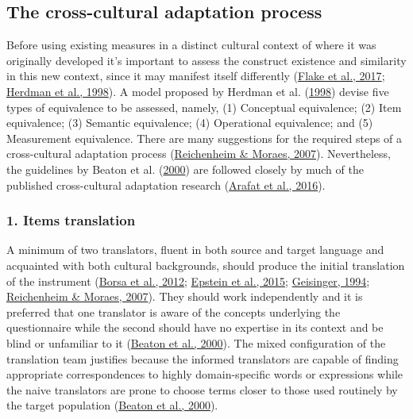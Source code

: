 \documentclass[
  ,doc,11pt, twoside,floatsintext]{apa6}
\begin{document}
\hypertarget{the-cross-cultural-adaptation-process}{%
\subsection{The cross-cultural adaptation process}\label{the-cross-cultural-adaptation-process}}

Before using existing measures in a distinct cultural context of where it was originally developed it's important to assess the construct existence and similarity in this new context, since it may manifest itself differently (\protect\hyperlink{ref-flakeConstructValidationSocial2017}{Flake et al., 2017}; \protect\hyperlink{ref-herdmanModelEquivalenceCultural1998}{Herdman et al., 1998}). A model proposed by Herdman et al. (\protect\hyperlink{ref-herdmanModelEquivalenceCultural1998}{1998}) devise five types of equivalence to be assessed, namely, (1) Conceptual equivalence; (2) Item equivalence; (3) Semantic equivalence; (4) Operational equivalence; and (5) Measurement equivalence. There are many suggestions for the required steps of a cross-cultural adaptation process (\protect\hyperlink{ref-reichenheim2007}{Reichenheim \& Moraes, 2007}). Nevertheless, the guidelines by Beaton et al. (\protect\hyperlink{ref-beaton2000}{2000}) are followed closely by much of the published cross-cultural adaptation research (\protect\hyperlink{ref-arafat2016}{Arafat et al., 2016}).

\hypertarget{items-translation}{%
\subsubsection{1. Items translation}\label{items-translation}}

A minimum of two translators, fluent in both source and target language and acquainted with both cultural backgrounds, should produce the initial translation of the instrument (\protect\hyperlink{ref-borsaAdaptacaoValidacaoInstrumentos2012}{Borsa et al., 2012}; \protect\hyperlink{ref-epstein2015}{Epstein et al., 2015}; \protect\hyperlink{ref-geisinger1994}{Geisinger, 1994}; \protect\hyperlink{ref-reichenheim2007}{Reichenheim \& Moraes, 2007}). They should work independently and it is preferred that one translator is aware of the concepts underlying the questionnaire while the second should have no expertise in its context and be blind or unfamiliar to it (\protect\hyperlink{ref-beaton2000}{Beaton et al., 2000}). The mixed configuration of the translation team justifies because the informed translators are capable of finding appropriate correspondences to highly domain-specific words or expressions while the naive translators are prone to choose terms closer to those used routinely by the target population (\protect\hyperlink{ref-beaton2000}{Beaton et al., 2000}).
\end{document}
